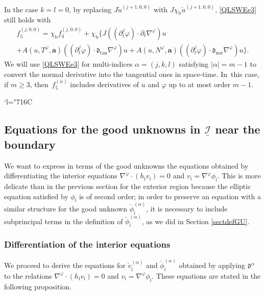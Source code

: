 \documentclass[JEP,XML,SOM,Unicode,NoFloatCountersInSection,published]{cedram}
\newcommand{\Changelback}{\mathcode`l="716C}
\newcommand{\dtan}{{\mathfrak d}_\mathrm{tan}}
\newcommand{\dnor}{{\mathfrak d}_\mathrm{nor}}
\newcommand{\dt}{\partial_t}
\newcommand{\cI}{{\mathcal I}}
\newcommand{\ul}[1]{\underline{#1}}
\theoremstyle{definition}
\begin{document}
In the case $k=l=0$, by replacing $J\check{u}^{(j+1,0,0)}$ with $J\chi_\mathrm{b}\check{u}^{(j+1,0,0)}$, \eqref{QLSWEe3} still holds with
\begin{multline*}
f_5^{(j,0,0)}
= \chi_\mathrm{b}f_4^{(j,0,0)} + \chi_\mathrm{b} \{ J((\dt^j\varphi)\cdot\dt\nabla^\varphi)u \\
+ A(u,T^\varphi,\bm{a})((\dt^j\varphi)\cdot\dtan\nabla^\varphi)u
+ A(u,N^\varphi,\bm{a})((\dt^j\varphi)\cdot\dnor\nabla^\varphi)u \}.
\end{multline*}
We will use \eqref{QLSWEe3} for multi-indices $\alpha=(j,k,l)$ satisfying $|\alpha|=m-1$ to convert the normal derivative into the tangential ones in space-time. In~this case, if $m\geq3$, then~$f_5^{(\alpha)}$ includes derivatives of $u$ and $\varphi$ up to at most order $m-1$.

\Changelback

\subsection{Equations for the good unknowns in $\ul{\cI}$ near the boundary}\label{sectnearbdry}
We want to express in terms of the good unknowns the equations obtained by differentiating the interior equations $\nabla^\varphi\cdot(h_\mathrm{i}v_\mathrm{i})=0$
and $v_\mathrm{i}=\nabla^\varphi\phi_\mathrm{i}$.
This is more delicate than in the previous section for the exterior region because the elliptic equation satisfied by $\phi_\mathrm{i}$ is of second order;
in order to preserve an equation with a similar structure for the good unknown $\check\phi_\mathrm{i}^{(\alpha)}$,
it is necessary to include subprincipal terms in the definition of $\check\phi_\mathrm{i}^{(\alpha)}$, as we did in Section \ref{sectdefGU}.

\subsubsection{Differentiation of the interior equations}
We proceed to derive the equations for $\check{v}_\mathrm{i}^{(\alpha)}$ and $\check{\phi}_\mathrm{i}^{(\alpha)}$
obtained by applying $\mathfrak{d}^\alpha$ to the relations $\nabla^\varphi\cdot (h_\mathrm{i}v_\mathrm{i})=0$ and $v_\mathrm{i}=\nabla^\varphi \phi_\mathrm{i}$.
These equations are stated in the following proposition.
\end{document}
